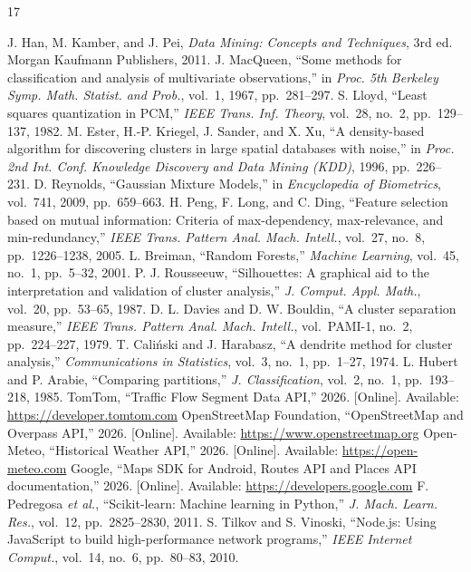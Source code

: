 \documentclass[12pt,a4paper]{report}
\begin{document}
\begin{thebibliography}{17}
 J. Han, M. Kamber, and J. Pei, \textit{Data Mining: Concepts and Techniques}, 3rd ed. Morgan Kaufmann Publishers, 2011.
 J. MacQueen, ``Some methods for classification and analysis of multivariate observations,'' in \textit{Proc. 5th Berkeley Symp. Math. Statist. and Prob.}, vol.~1, 1967, pp.~281--297.
 S. Lloyd, ``Least squares quantization in PCM,'' \textit{IEEE Trans. Inf. Theory}, vol.~28, no.~2, pp.~129--137, 1982.
 M. Ester, H.-P. Kriegel, J. Sander, and X. Xu, ``A density-based algorithm for discovering clusters in large spatial databases with noise,'' in \textit{Proc. 2nd Int. Conf. Knowledge Discovery and Data Mining (KDD)}, 1996, pp.~226--231.
 D. Reynolds, ``Gaussian Mixture Models,'' in \textit{Encyclopedia of Biometrics}, vol.~741, 2009, pp.~659--663.
 H. Peng, F. Long, and C. Ding, ``Feature selection based on mutual information: Criteria of max-dependency, max-relevance, and min-redundancy,'' \textit{IEEE Trans. Pattern Anal. Mach. Intell.}, vol.~27, no.~8, pp.~1226--1238, 2005.
 L. Breiman, ``Random Forests,'' \textit{Machine Learning}, vol.~45, no.~1, pp.~5--32, 2001.
 P. J. Rousseeuw, ``Silhouettes: A graphical aid to the interpretation and validation of cluster analysis,'' \textit{J. Comput. Appl. Math.}, vol.~20, pp.~53--65, 1987.
 D. L. Davies and D. W. Bouldin, ``A cluster separation measure,'' \textit{IEEE Trans. Pattern Anal. Mach. Intell.}, vol.~PAMI-1, no.~2, pp.~224--227, 1979.
 T. Caliński and J. Harabasz, ``A dendrite method for cluster analysis,'' \textit{Communications in Statistics}, vol.~3, no.~1, pp.~1--27, 1974.
 L. Hubert and P. Arabie, ``Comparing partitions,'' \textit{J. Classification}, vol.~2, no.~1, pp.~193--218, 1985.
 TomTom, ``Traffic Flow Segment Data API,'' 2026. [Online]. Available: \url{https://developer.tomtom.com}
 OpenStreetMap Foundation, ``OpenStreetMap and Overpass API,'' 2026. [Online]. Available: \url{https://www.openstreetmap.org}
 Open-Meteo, ``Historical Weather API,'' 2026. [Online]. Available: \url{https://open-meteo.com}
 Google, ``Maps SDK for Android, Routes API and Places API documentation,'' 2026. [Online]. Available: \url{https://developers.google.com}
 F. Pedregosa \textit{et al.}, ``Scikit-learn: Machine learning in Python,'' \textit{J. Mach. Learn. Res.}, vol.~12, pp.~2825--2830, 2011.
 S. Tilkov and S. Vinoski, ``Node.js: Using JavaScript to build high-performance network programs,'' \textit{IEEE Internet Comput.}, vol.~14, no.~6, pp.~80--83, 2010.
\end{thebibliography}
\end{document}
